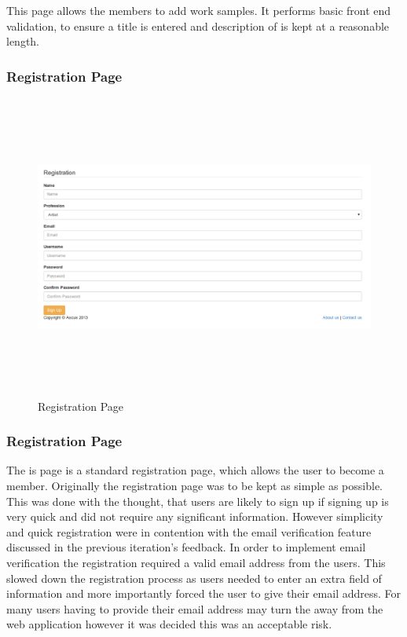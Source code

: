 \documentclass[a4paper,oneside,11pt]{report}
\begin{document}
This page allows the members to add work samples. It performs basic front end validation, to ensure a title is entered and description of is kept at a reasonable length.
\pagebreak

\subsubsection{Registration Page}
\begin{figure}[!ht]
\centering
\includegraphics[width=\textwidth,height=10cm,keepaspectratio]{registration-second-iteration.png}
\caption{Registration Page}
\end{figure}


\subsubsection{Registration Page}
The is page is a standard registration page, which allows the user to become a member. Originally the registration page was to be kept as simple as possible. This was done with the thought, that users are likely to sign up if signing up is very quick and did not require any significant information. However simplicity and quick registration were in contention with the email verification feature discussed in the previous iteration's feedback. In order to implement email verification the registration required a valid email address from the users. This slowed down the registration process as users needed to enter an extra field of information and more importantly forced the user to give their email address. For many users having to provide their email address may turn the away from the web application however it was decided this was an acceptable risk.
\pagebreak
\end{document}
